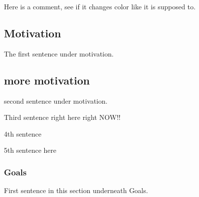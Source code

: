 \documentclass[modern]{CORE-AAS/aastex631}
\begin{document}
{Here is a comment, see if it changes color like it is supposed to. 
\subsection{Motivation} %
\label{sub:motivation}

The first sentence under motivation. \citep{bernardi+2006aj131_1288}
\subsection{more motivation}
\label{sub:more_motivation}

second sentence under motivation.

Third sentence right here right NOW!! 


4th sentence 

5th sentence here 

\subsubsection{Goals}
\label{subsub:goals}
First sentence in this section underneath Goals. 

}
\end{document}
